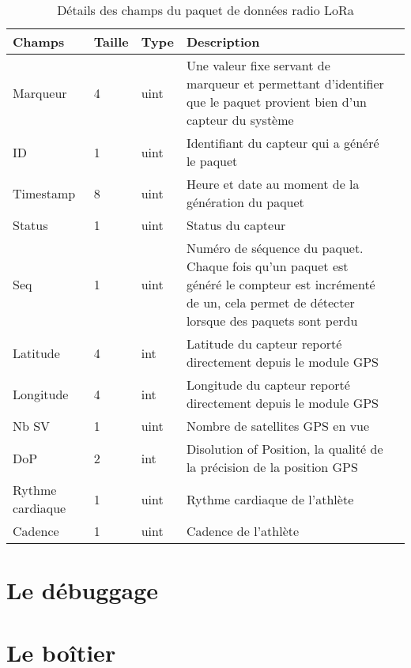 \begin{table}[htb]
\caption{Détails des champs du paquet de données radio LoRa}
\label{tab:sensor_packet_format}
\centering
\begin{tabular}{ l l l p{9cm} l }
\toprule
Champs & Taille & Type & Description \\
\midrule
Marqueur & 4 & uint & Une valeur fixe servant de marqueur et permettant d'identifier que le paquet provient bien d'un capteur du système \\
ID & 1 & uint & Identifiant du capteur qui a généré le paquet \\
Timestamp & 8 & uint & Heure et date au moment de la génération du paquet \\
Status & 1 & uint & Status du capteur \\
Seq & 1 & uint & Numéro de séquence du paquet. Chaque fois qu'un paquet est généré le compteur est incrémenté de un, cela permet de détecter lorsque des paquets sont perdu \\
Latitude & 4 & int & Latitude du capteur reporté directement depuis le module GPS \\
Longitude & 4 & int & Longitude du capteur reporté directement depuis le module GPS \\
Nb SV & 1 & uint & Nombre de satellites GPS en vue \\
DoP & 2 & int & Disolution of Position, la qualité de la précision de la position GPS \\
Rythme cardiaque & 1 & uint & Rythme cardiaque de l'athlète \\
Cadence & 1 & uint & Cadence de l'athlète \\
\bottomrule 
\end{tabular}
\end{table}

\section{Le débuggage}

\todo{}

\section{Le boîtier}

\todo{}
